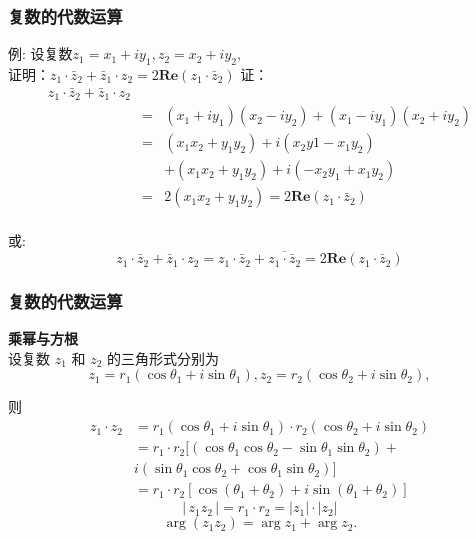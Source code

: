 \documentclass{beamer}
\begin{document}
\begin{frame}[t]
\frametitle{复数的代数运算}
\begin{exampleblock}{例: 设复数$z_1 =x_1 + iy_1, z_2 =x_2 + iy_2,$\\
证明：$z_1 \cdot \bar{z}_2 +  \bar{z}_1 \cdot z_2= 2 \mathbf {Re} (z_1 \cdot \bar{z}_2)$}
证： 
\begin{eqnarray*}
z_1 \cdot \bar{z}_2  + \bar{z}_1 \cdot z_2 \\
&=& (x_1 + iy_1)(x_2 - iy_2)+(x_1 - iy_1)(x_2 + iy_2)\\
&=& (x_1x_2+y_1y_2)+i(x_2y1-x_1y_2) \\
& & +(x_1x_2+y_1y_2)+i(-x_2y_1+x_1y_2)\\
&=& 2(x_1x_2+y_1y_2) = 2 \mathbf {Re} (z_1 \cdot \bar{z}_2)
\end{eqnarray*} \\

或:
 $$z_1 \cdot \bar{z}_2 + \bar{z}_1 \cdot z_2 = z_1 \cdot \bar{z}_2 + \overline{z_1 \cdot \bar{z}_2} =2 \mathbf {Re} (z_1 \cdot \bar{z}_2)$$
\end{exampleblock} 

\end{frame}



\begin{frame}[t]
\frametitle{复数的代数运算}
\textbf{乘幂与方根}\\
设复数 $ {z_1} $ 和 $ {z_2} $ 的三角形式分别为
\[ {z_1} = {r_1}(\cos {\theta _1} + i\sin {\theta _1}), {z_2} = {r_2}(\cos {\theta _2} + i\sin {\theta _2}), \]

则
\begin{align*}
{z_1} \cdot {z_2} &= {r_1}(\cos {\theta _1} + i\sin {\theta _1}) \cdot {r_2}(\cos {\theta _2} + i\sin {\theta _2})\\
&= {r_1} \cdot {r_2}[(\cos {\theta _1}\cos {\theta _2} - \sin {\theta _1}\sin {\theta _2}) + \\
& i(\sin {\theta _1}\cos {\theta _2} + \cos {\theta _1}\sin {\theta _2})]\\
& = {r_1} \cdot {r_2}[\cos ({\theta _1} + {\theta _2}) + i\sin ({\theta _1} + {\theta _2})]
\end{align*}
\[ \left| {\, {z_1}{z_2}\, } \right| = {r_1} \cdot {r_2} = \left| {{z_1}} \right| \cdot \left| {{z_2}} \right| \]
\[ {{\arg}}({z_1}{z_2}) = {{\arg}}{z_1} + {{\arg}}{z_2}. \]
\end{frame}
\end{document}
